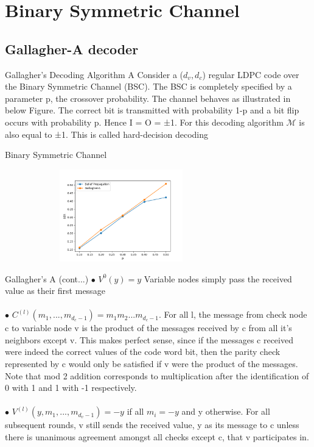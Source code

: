\section{Binary Symmetric Channel}
\subsection{Gallagher-A decoder}
\begin{frame}{Gallagher’s Decoding Algorithm A}
\;\;\;\;\;\;Consider a ($d_v, d_c$) regular
LDPC code over the Binary Symmetric Channel (BSC). The BSC
is completely specified by a parameter p, the crossover probability.
The channel behaves as illustrated in below Figure. The correct bit is
transmitted with probability 1-p and a bit flip occurs with probability
p. Hence I = O = ±1. For this decoding algorithm $\mathcal{M}$ is also equal
to ±1. This is called hard-decision decoding 
\begin{exampleblock}{Binary Symmetric Channel}
\begin{figure}
			\includegraphics[width=8cm, height=4cm]{BSC/bsc.png}
			\label{bsc}
\end{figure}
\end{exampleblock}

\end{frame}

\begin{frame}{Gallagher's A (cont...)}
$\bullet$ $V^{0}(y) = y$  Variable nodes simply pass the received value as
their first message\\~\\
$\bullet$ $C^{(l)}(m_1, . . . , m_{d_c-1}) = m_1m_2 . . . m_{d_c-1}.$ For all l, the message from check node c to variable node v is the product of the messages received by c from all it’s neighbors except v. This makes perfect sense, since if the messages c received were indeed the correct values of the code word bit, then the parity check represented by c would only be satisfied if v were the product of the messages. Note that mod 2 addition corresponds
to multiplication after the identification of 0 with 1 and 1 with -1 respectively.\\~\\
$\bullet$ $V^{(l)}(y, m_1, . . . , m_{d_v-1}) = -y$ if all\;\; $ m_i = -y$ and y otherwise. For all subsequent rounds, v still sends the received value, y as its message to c unless there is unanimous agreement amongst all checks except c, that v participates in.
\end{frame}


